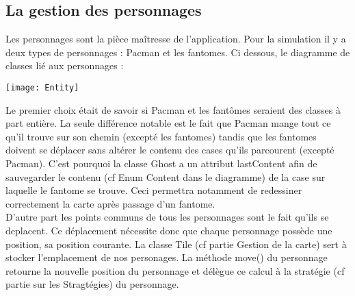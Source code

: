 \subsection{La gestion des personnages}

Les personnages sont la pièce maîtresse de l'application. Pour la simulation il y a deux types de personnages : Pacman et les fantomes.
Ci dessous, le diagramme de classes lié aux personnages : \\[0.5cm]
\centerline{\texttt{[image: Entity]}}

Le premier choix était de savoir si Pacman et les fantômes seraient des classes à part entière. La seule différence notable est le fait que Pacman mange tout ce qu'il trouve sur son chemin (excepté les fantomes) tandis que les fantomes doivent se déplacer sans altérer le contenu des cases qu'ils parcourent (excepté Pacman). C'est pourquoi la classe Ghost a un attribut lastContent afin de sauvegarder le contenu (cf Enum Content dans le diagramme) de la case sur laquelle le fantome se trouve.
Ceci permettra notamment de redessiner correctement la carte après passage d'un fantome. \\
D'autre part les points communs de tous les personnages sont le fait qu'ils se deplacent. Ce déplacement nécessite donc que chaque personnage possède une position, sa position courante. La classe Tile (cf partie Gestion de la carte) sert à stocker l'emplacement de nos personages. La méthode move() du personnage retourne la nouvelle position du personnage et délègue ce calcul à la stratégie (cf partie sur les Stragtégies) du personnage.



